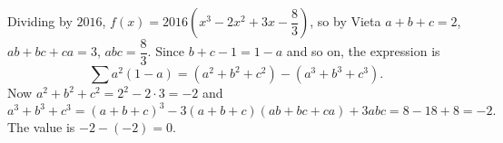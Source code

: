 Dividing by $2016$, $f(x)=2016\left(x^3-2x^2+3x-\dfrac{8}{3}\right)$, so by Vieta $a+b+c=2$, $ab+bc+ca=3$, $abc=\dfrac{8}{3}$. Since $b+c-1=1-a$ and so on, the expression is
\[\sum a^2(1-a)=\left(a^2+b^2+c^2\right)-\left(a^3+b^3+c^3\right).\]
Now $a^2+b^2+c^2=2^2-2\cdot3=-2$ and
\[a^3+b^3+c^3=(a+b+c)^3-3(a+b+c)(ab+bc+ca)+3abc=8-18+8=-2.\]
The value is $-2-(-2)=\boxed{0}$.
